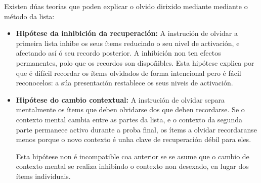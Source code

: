 \documentclass[a4paper,11pt]{article}
\begin{document}
\begin{itemize}
	Existen dúas teorías que poden explicar o olvido dirixido mediante mediante o método da lista:
	\begin{itemize}
		\item \textbf{Hipótese da inhibición da recuperación:} A instrución de olvidar a primeira 
		lista inhibe os seus ítems reducindo o seu nivel de activación, e afectando así ó seu 
		recordo posterior. A inhibición non ten efectos permanentes, polo que os recordos son 
		dispoñibles. Esta hipótese explica por que é difícil recordar os ítems olvidados de forma 
		intencional pero é fácil reconocelos: a súa presentación restablece os seus niveis de 
		activación.
		\item \textbf{Hipótese do cambio contextual:} A instrución de olvidar separa mentalmente os 
		ítems que deben olvidarse dos que deben recordarse. Se o contexto mental cambia entre as 
		partes da lista, e o contexto da segunda parte permanece activo durante a proba final, os 
		ítems a olvidar recordaranse menos porque o novo contexto é unha clave de recuperación débil 
		para eles. 
		
		Esta hipótese non é incompatible coa anterior se se asume que o cambio de contexto mental se 
		realiza inhibindo o contexto non desexado, en lugar dos ítems individuais.
	\end{itemize}
\end{itemize}
\end{document}
